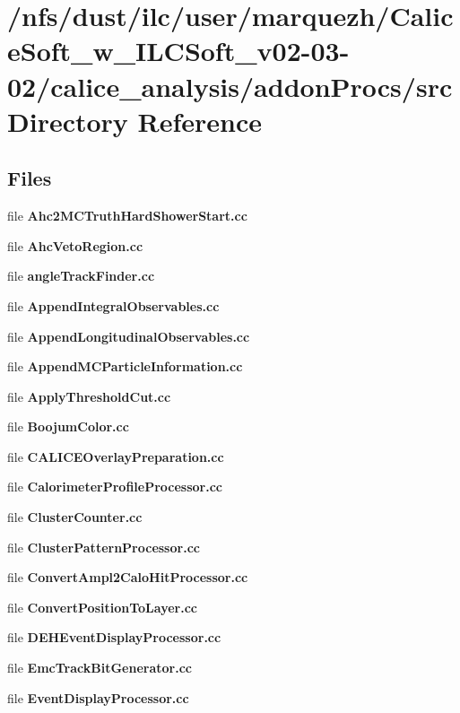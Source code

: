 \section{/nfs/dust/ilc/user/marquezh/\-Calice\-Soft\-\_\-w\-\_\-\-I\-L\-C\-Soft\-\_\-v02-\/03-\/02/calice\-\_\-analysis/addon\-Procs/src Directory Reference}
\label{dir_b8fa9d56b8256520c2d48314318d5e29}
\subsection*{Files}
\begin{DoxyCompactItemize}
\item 
file {\bfseries Ahc2\-M\-C\-Truth\-Hard\-Shower\-Start.\-cc}
\item 
file {\bfseries Ahc\-Veto\-Region.\-cc}
\item 
file {\bfseries angle\-Track\-Finder.\-cc}
\item 
file {\bfseries Append\-Integral\-Observables.\-cc}
\item 
file {\bfseries Append\-Longitudinal\-Observables.\-cc}
\item 
file {\bfseries Append\-M\-C\-Particle\-Information.\-cc}
\item 
file {\bfseries Apply\-Threshold\-Cut.\-cc}
\item 
file {\bfseries Boojum\-Color.\-cc}
\item 
file {\bfseries C\-A\-L\-I\-C\-E\-Overlay\-Preparation.\-cc}
\item 
file {\bfseries Calorimeter\-Profile\-Processor.\-cc}
\item 
file {\bfseries Cluster\-Counter.\-cc}
\item 
file {\bfseries Cluster\-Pattern\-Processor.\-cc}
\item 
file {\bfseries Convert\-Ampl2\-Calo\-Hit\-Processor.\-cc}
\item 
file {\bfseries Convert\-Position\-To\-Layer.\-cc}
\item 
file {\bfseries D\-E\-H\-Event\-Display\-Processor.\-cc}
\item 
file {\bfseries Emc\-Track\-Bit\-Generator.\-cc}
\item 
file {\bfseries Event\-Display\-Processor.\-cc}
\item 

\end{DoxyCompactItemize}
